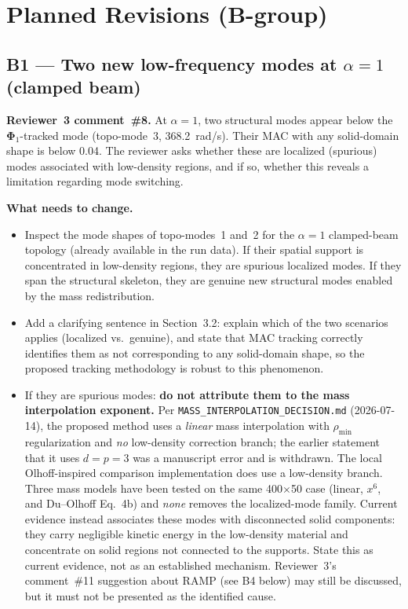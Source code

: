 \documentclass[12pt,a4paper]{article}
\begin{document}
\section{Planned Revisions (B-group)}

\subsection{B1 — Two new low-frequency modes at $\alpha=1$ (clamped beam)}

\textbf{Reviewer~3 comment~\#8.}  At $\alpha=1$, two structural modes appear
below the $\boldsymbol{\Phi}_1$-tracked mode (topo-mode~3, 368.2~rad/s).
Their MAC with any solid-domain shape is below 0.04. The reviewer asks
whether these are localized (spurious) modes associated with low-density
regions, and if so, whether this reveals a limitation regarding mode
switching.

\textbf{What needs to change.}
\begin{itemize}[leftmargin=1.6em]
  \item Inspect the mode shapes of topo-modes~1 and~2 for the $\alpha=1$
        clamped-beam topology (already available in the run data). If their
        spatial support is concentrated in low-density regions, they are
        spurious localized modes. If they span the structural skeleton, they
        are genuine new structural modes enabled by the mass redistribution.
  \item Add a clarifying sentence in Section~3.2: explain which of the two
        scenarios applies (localized vs.\ genuine), and state that MAC
        tracking correctly identifies them as not corresponding to any
        solid-domain shape, so the proposed tracking methodology is robust to
        this phenomenon.
  \item If they are spurious modes: \textbf{do not attribute them to the mass
        interpolation exponent.}  Per
        \texttt{MASS\_INTERPOLATION\_DECISION.md} (2026-07-14), the proposed
        method uses a \emph{linear} mass interpolation with $\rho_\mathrm{min}$
        regularization and \emph{no} low-density correction branch; the earlier
        statement that it uses $d=p=3$ was a manuscript error and is withdrawn.
        The local Olhoff-inspired comparison implementation does use a
        low-density branch.  Three mass models have been tested on the same
        400$\times$50 case (linear, $x^6$, and Du--Olhoff Eq.~4b) and
        \emph{none} removes the localized-mode family.  Current evidence
        instead associates these modes with disconnected solid components:
        they carry negligible kinetic energy in the low-density material and
        concentrate on solid regions not connected to the supports.  State this
        as current evidence, not as an established mechanism.  Reviewer~3's
        comment~\#11 suggestion about RAMP (see B4 below) may still be
        discussed, but it must not be presented as the identified cause.
\end{itemize}
\end{document}
